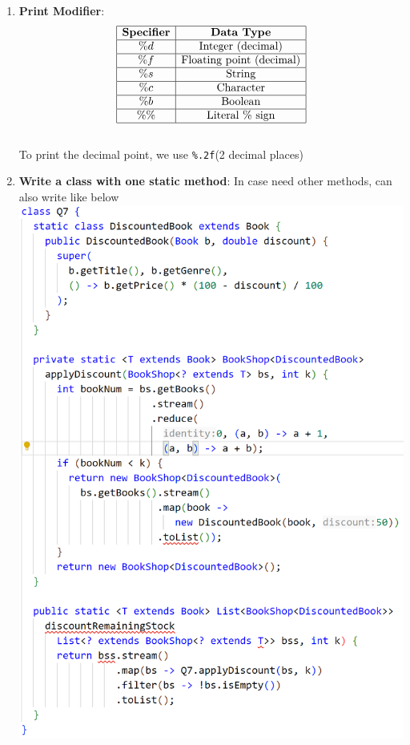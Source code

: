 \documentclass[10pt, landscape]{article}
\begin{document}
\begin{multicols}{4}
\begin{enumerate}
    \item \textbf{Print Modifier}: \\
        \[
        \begin{array}{|c|c|}
        \hline
        \textbf{Specifier} & \textbf{Data Type} \\
        \hline
        \%d & \text{Integer (decimal)} \\
        \hline
        \%f & \text{Floating~point (decimal)} \\
        \hline
        \%s & \text{String} \\
        \hline
        \%c & \text{Character} \\
        \hline
        \%b & \text{Boolean} \\
        \hline
        \%\% & \text{Literal \% sign} \\
        \hline
        \end{array}
        \]
        \\
        To print the decimal point, we use \texttt{\%.2f}(2 decimal places)
    \item \textbf{Write a class with one static method}: In case need other methods, can also write like below \\
    \includegraphics[width=1\linewidth]{PE/PE2/images/11.png}
\end{enumerate}

\end{multicols}

\hrulefill \\
\begin{multicols}{3}

\end{multicols}
\end{document}
